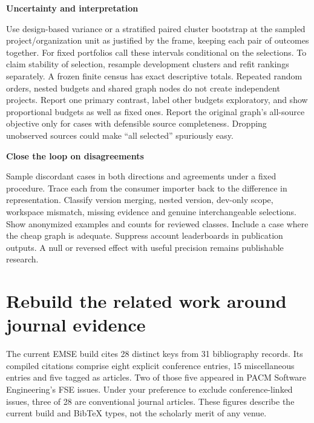 \documentclass[11pt,a4paper]{article}
\newcommand{\pg}[1]{\newpage\section{\color{ink}#1}}
\newcommand{\hd}[1]{\par\textbf{\color{accent}#1}\par\nopagebreak}
\begin{document}
\hd{Uncertainty and interpretation}
Use design-based variance or a stratified paired cluster bootstrap at the sampled project/organization unit as justified by the frame, keeping each pair of outcomes together. For fixed portfolios call these intervals conditional on the selections. To claim stability of selection, resample development clusters and refit rankings separately. A frozen finite census has exact descriptive totals. Repeated random orders, nested budgets and shared graph nodes do not create independent projects. Report one primary contrast, label other budgets exploratory, and show proportional budgets as well as fixed ones. Report the original graph's all-source objective only for cases with defensible source completeness. Dropping unobserved sources could make “all selected” spuriously easy.

\hd{Close the loop on disagreements}
Sample discordant cases in both directions and agreements under a fixed procedure. Trace each from the consumer importer back to the difference in representation. Classify version merging, nested version, dev-only scope, workspace mismatch, missing evidence and genuine interchangeable selections. Show anonymized examples and counts for reviewed classes. Include a case where the cheap graph is adequate. Suppress account leaderboards in publication outputs. A null or reversed effect with useful precision remains publishable research.

\pg{Rebuild the related work around journal evidence}
The current EMSE build cites 28 distinct keys from 31 bibliography records. Its compiled citations comprise eight explicit conference entries, 15 miscellaneous entries and five tagged as articles. Two of those five appeared in PACM Software Engineering's FSE issues. Under your preference to exclude conference-linked issues, three of 28 are conventional journal articles. These figures describe the current build and BibTeX types, not the scholarly merit of any venue.
\end{document}
